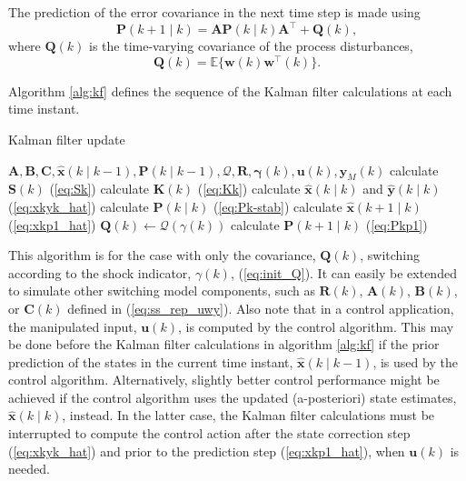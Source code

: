 The prediction of the error covariance in the next time step is made using
%
\begin{equation} \label{eq:Pkp1}
	\mathbf{P}(k+1 \mid k) = \mathbf{A} \mathbf{P}(k \mid k)  \mathbf{A}^\intercal  + \mathbf{Q}(k),
\end{equation}
where $\mathbf{Q}(k)$ is the time-varying covariance of the process disturbances,
%
\begin{equation} \label{eq:Q}
	\mathbf{Q}(k) = \mathbb{E}\{ \mathbf{w}(k) \mathbf{w}^\intercal(k) \}.
\end{equation}

Algorithm \ref{alg:kf} defines the sequence of the Kalman filter calculations at each time instant. 
\begin{algorithm}
	\caption{Kalman filter update}\label{alg:kf}
	\begin{algorithmic}
		\Require $\mathbf{A},\mathbf{B},\mathbf{C},\mathbf{\hat{x}}(k \mid k-1), \mathbf{P}(k \mid k-1), \mathcal{Q}, \mathbf{R}, \mathbf{\gamma}(k), \mathbf{u}(k), \mathbf{y}_M(k)$
		\State calculate $\mathbf{S}(k)$ (\ref{eq:Sk})
		\State calculate $\mathbf{K}(k)$ (\ref{eq:Kk})
		\State calculate $\mathbf{\hat{x}}(k \mid k)$ and $\mathbf{\hat{y}}(k \mid k)$ (\ref{eq:xkyk_hat})
		\State calculate $\mathbf{P}(k \mid k)$ (\ref{eq:Pk-stab})
		\State calculate $\mathbf{\hat{x}}(k+1 \mid k)$ (\ref{eq:xkp1_hat})
		\State $\mathbf{Q}(k) \gets \mathcal{Q}(\gamma(k))$
		\State calculate $\mathbf{P}(k+1 \mid k)$ (\ref{eq:Pkp1})
	\end{algorithmic}
\end{algorithm}
%
This algorithm is for the case with only the covariance, $\mathbf{Q}(k)$, switching according to the shock indicator, $\gamma(k)$, (\ref{eq:init_Q}). It can easily be extended to simulate other switching model components, such as $\mathbf{R}(k)$, $\mathbf{A}(k)$, $\mathbf{B}(k)$, or $\mathbf{C}(k)$ defined in (\ref{eq:ss_rep_uwy}). Also note that in a control application, the manipulated input, $\mathbf{u}(k)$, is computed by the control algorithm. This may be done before the Kalman filter calculations in algorithm \ref{alg:kf} if the prior prediction of the states in the current time instant, $\hat{\mathbf{x}}(k \mid k-1)$, is used by the control algorithm. Alternatively, slightly better control performance might be achieved if the control algorithm uses the updated (a-posteriori) state estimates, $\hat{\mathbf{x}}(k \mid k)$, instead. In the latter case, the Kalman filter calculations must be interrupted to compute the control action after the state correction step (\ref{eq:xkyk_hat}) and prior to the prediction step (\ref{eq:xkp1_hat}), when $\mathbf{u}(k)$ is needed.

